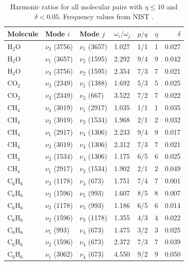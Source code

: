 \documentclass[11pt,twocolumn,a4paper]{article}
\theoremstyle{definition}
\theoremstyle{remark}
\begin{document}
\begin{table}[H]
\centering
\caption{Harmonic ratios for all molecular pairs with $\eta \leq 10$ and $\delta < 0.05$. Frequency values from NIST \citep{shimanouchi1972, huber1979, nist_webbook}.}
\label{tab:harmonic_ratios}
\small
\begin{tabular}{@{}llllccr@{}}
\toprule
Molecule & Mode $i$ & Mode $j$ & $\omega_i/\omega_j$ & $p/q$ & $\eta$ & $\delta$ \\
\midrule
H$_2$O & $\nu_3$ (3756) & $\nu_1$ (3657) & 1.027 & 1/1 & 1 & 0.027 \\
H$_2$O & $\nu_1$ (3657) & $\nu_2$ (1595) & 2.292 & 9/4 & 9 & 0.042 \\
H$_2$O & $\nu_3$ (3756) & $\nu_2$ (1595) & 2.354 & 7/3 & 7 & 0.021 \\
\midrule
CO$_2$ & $\nu_3$ (2349) & $\nu_1$ (1388) & 1.692 & 5/3 & 5 & 0.025 \\
CO$_2$ & $\nu_3$ (2349) & $\nu_2$ (667)  & 3.522 & 7/2 & 7 & 0.022 \\
\midrule
CH$_4$ & $\nu_3$ (3019) & $\nu_1$ (2917) & 1.035 & 1/1 & 1 & 0.035 \\
CH$_4$ & $\nu_3$ (3019) & $\nu_2$ (1534) & 1.968 & 2/1 & 2 & 0.032 \\
CH$_4$ & $\nu_1$ (2917) & $\nu_4$ (1306) & 2.233 & 9/4 & 9 & 0.017 \\
CH$_4$ & $\nu_3$ (3019) & $\nu_4$ (1306) & 2.312 & 7/3 & 7 & 0.021 \\
CH$_4$ & $\nu_2$ (1534) & $\nu_4$ (1306) & 1.175 & 6/5 & 6 & 0.025 \\
CH$_4$ & $\nu_1$ (2917) & $\nu_2$ (1534) & 1.902 & 2/1 & 2 & 0.049 \\
\midrule
C$_6$H$_6$ & $\nu_3$ (1178) & $\nu_4$ (673) & 1.751 & 7/4 & 7 & 0.001 \\
C$_6$H$_6$ & $\nu_2$ (1596) & $\nu_5$ (993) & 1.607 & 8/5 & 8 & 0.007 \\
C$_6$H$_6$ & $\nu_3$ (1178) & $\nu_5$ (993) & 1.186 & 6/5 & 6 & 0.014 \\
C$_6$H$_6$ & $\nu_2$ (1596) & $\nu_3$ (1178) & 1.355 & 4/3 & 4 & 0.022 \\
C$_6$H$_6$ & $\nu_5$ (993)  & $\nu_4$ (673)  & 1.475 & 3/2 & 3 & 0.025 \\
C$_6$H$_6$ & $\nu_2$ (1596) & $\nu_4$ (673)  & 2.372 & 7/3 & 7 & 0.039 \\
C$_6$H$_6$ & $\nu_1$ (3062) & $\nu_4$ (673)  & 4.550 & 9/2 & 9 & 0.050 \\
\bottomrule
\end{tabular}
\end{table}
\end{document}
